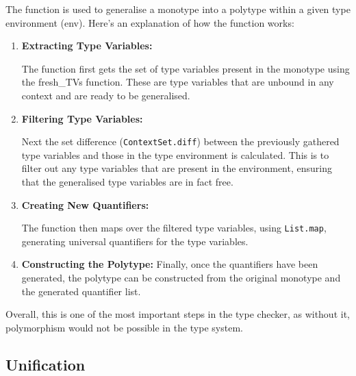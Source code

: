 \documentclass{l4proj}
\begin{document}
The function is used to generalise a monotype into a polytype within a given type environment (env). Here's an explanation of how the function works:

\begin{enumerate}
    \item \textbf{Extracting Type Variables:}

    The function first gets the set of type variables present in the monotype using the fresh\_TVs function.
    These are type variables that are unbound in any context and are ready to be generalised.

    \item \textbf{Filtering Type Variables:}

    Next the set difference (\texttt{ContextSet.diff}) between the previously gathered type variables and those in the type environment is calculated.
    This is to filter out any type variables that are present in the environment, ensuring that the generalised type variables are in fact free.

    \item \textbf{Creating New Quantifiers:}
    
    The function then maps over the filtered type variables, using \texttt{List.map}, generating universal quantifiers for the type variables.

    \item \textbf{Constructing the Polytype:}
    Finally, once the quantifiers have been generated, the polytype can be constructed from the original monotype and the generated quantifier list.
\end{enumerate}

Overall, this is one of the most important steps in the type checker, as without it, polymorphism would not be possible in the type system.

\subsection{Unification}
\label{sec:implementation-unification}
\end{document}
